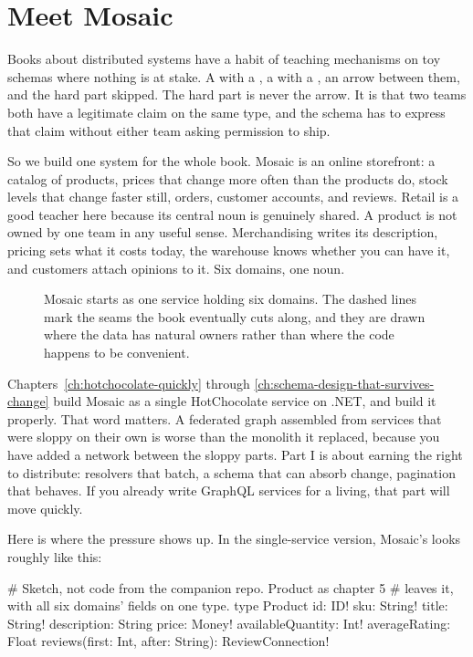 \section{Meet Mosaic}
\label{sec:ch01-meet-mosaic}

Books about distributed systems have a habit of teaching mechanisms on toy
schemas where nothing is at stake. A  with a , a
 with a , an arrow between them, and the hard part
skipped. The hard part is never the arrow. It is that two teams both have a
legitimate claim on the same type, and the schema has to express that claim
without either team asking permission to ship.

So we build one system for the whole book. Mosaic is an online storefront: a
catalog of products, prices that change more often than the products do,
stock levels that change faster still, orders, customer accounts, and reviews.
Retail is a good teacher here because its central noun is genuinely shared.
A product is not owned by one team in any useful sense. Merchandising writes
its description, pricing sets what it costs today, the warehouse knows whether
you can have it, and customers attach opinions to it. Six domains, one noun.

\begin{figure}[htbp]
  \centering
  
  \caption{Mosaic starts as one service holding six domains. The dashed lines
  mark the seams the book eventually cuts along, and they are drawn where the
  data has natural owners rather than where the code happens to be
  convenient.}
  \label{fig:ch01-mosaic-domains}
\end{figure}

Chapters~\ref{ch:hotchocolate-quickly} through
\ref{ch:schema-design-that-survives-change} build Mosaic as a single
HotChocolate service on .NET, and build it properly. That word matters. A
federated graph assembled from services that were sloppy on their own is
worse than the monolith it replaced, because you have added a network between
the sloppy parts. Part I is about earning the right to distribute: resolvers
that batch, a schema that can absorb change, pagination that behaves. If you
already write GraphQL services for a living, that part will move quickly.

Here is where the pressure shows up. In the single-service version, Mosaic's
 looks roughly like this:

\begin{graphqlsdl}
# Sketch, not code from the companion repo. Product as chapter 5
# leaves it, with all six domains' fields on one type.
type Product {
  id: ID!
  sku: String!
  title: String!
  description: String
  price: Money!
  availableQuantity: Int!
  averageRating: Float
  reviews(first: Int, after: String): ReviewConnection!
}
\end{graphqlsdl}

